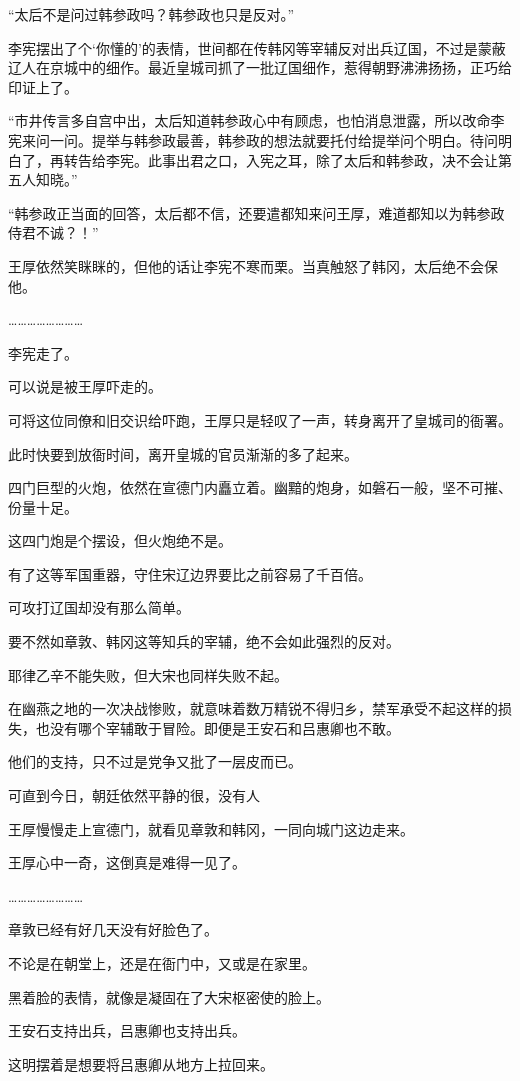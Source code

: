 “太后不是问过韩参政吗？韩参政也只是反对。”

李宪摆出了个‘你懂的’的表情，世间都在传韩冈等宰辅反对出兵辽国，不过是蒙蔽辽人在京城中的细作。最近皇城司抓了一批辽国细作，惹得朝野沸沸扬扬，正巧给印证上了。

“市井传言多自宫中出，太后知道韩参政心中有顾虑，也怕消息泄露，所以改命李宪来问一问。提举与韩参政最善，韩参政的想法就要托付给提举问个明白。待问明白了，再转告给李宪。此事出君之口，入宪之耳，除了太后和韩参政，决不会让第五人知晓。”

“韩参政正当面的回答，太后都不信，还要遣都知来问王厚，难道都知以为韩参政侍君不诚？！”

王厚依然笑眯眯的，但他的话让李宪不寒而栗。当真触怒了韩冈，太后绝不会保他。

……………………

李宪走了。

可以说是被王厚吓走的。

可将这位同僚和旧交识给吓跑，王厚只是轻叹了一声，转身离开了皇城司的衙署。

此时快要到放衙时间，离开皇城的官员渐渐的多了起来。

四门巨型的火炮，依然在宣德门内矗立着。幽黯的炮身，如磐石一般，坚不可摧、份量十足。

这四门炮是个摆设，但火炮绝不是。

有了这等军国重器，守住宋辽边界要比之前容易了千百倍。

可攻打辽国却没有那么简单。

要不然如章敦、韩冈这等知兵的宰辅，绝不会如此强烈的反对。

耶律乙辛不能失败，但大宋也同样失败不起。

在幽燕之地的一次决战惨败，就意味着数万精锐不得归乡，禁军承受不起这样的损失，也没有哪个宰辅敢于冒险。即便是王安石和吕惠卿也不敢。

他们的支持，只不过是党争又批了一层皮而已。

可直到今日，朝廷依然平静的很，没有人

王厚慢慢走上宣德门，就看见章敦和韩冈，一同向城门这边走来。

王厚心中一奇，这倒真是难得一见了。

……………………

章敦已经有好几天没有好脸色了。

不论是在朝堂上，还是在衙门中，又或是在家里。

黑着脸的表情，就像是凝固在了大宋枢密使的脸上。

王安石支持出兵，吕惠卿也支持出兵。

这明摆着是想要将吕惠卿从地方上拉回来。

